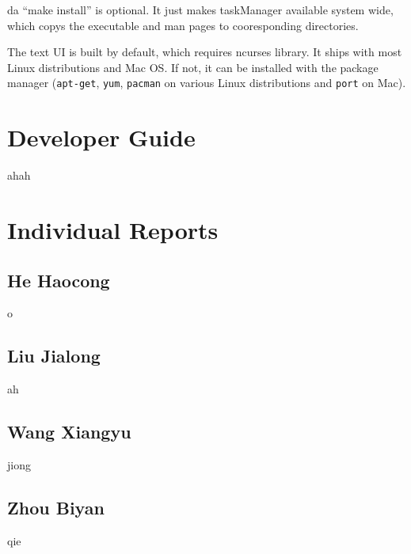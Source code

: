 \documentclass[12pt, a4paper]{article}
\begin{document}
da ``make install'' is optional. It just makes taskManager available system wide, which copys the executable and man pages to cooresponding directories.

The text UI is built by default, which requires ncurses library.
It ships with most Linux distributions and Mac OS. If not, it can be installed with the package manager (\texttt{apt-get}, \texttt{yum}, \texttt{pacman} on various Linux distributions and \texttt{port} on Mac).

\section{Developer Guide}
ahah

\section{Individual Reports}
\subsection{He Haocong}
o
\subsection{Liu Jialong}
ah
\subsection{Wang Xiangyu}
jiong
\subsection{Zhou Biyan}
qie
\end{document}
